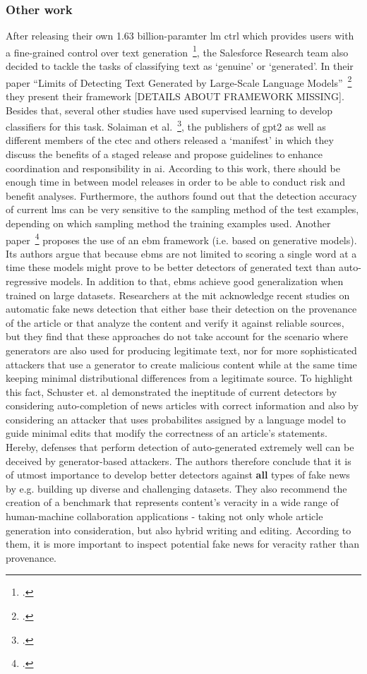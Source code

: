 \subsubsection{Other work}
\label{sub:other_work}

After releasing their own 1.63 billion-paramter \gls{lm} \gls{ctrl} which provides users with a fine-grained control over text generation~\footcite{keskar2019ctrl}, the Salesforce Research team also decided to tackle the tasks of classifying text as `genuine' or `generated'. In their paper ``Limits of Detecting Text Generated by Large-Scale Language Models''~\footcite{varshney2020limits} they present their framework [DETAILS ABOUT FRAMEWORK MISSING]. Besides that, several other studies have used supervised learning to develop classifiers for this task.
Solaiman et al.~\footcite{solaiman2019release}, the publishers of \gls{gpt2} as well as different members of the \gls{ctec} and others released a `manifest' in which they discuss the benefits of a staged release and propose guidelines to enhance coordination and responsibility in \gls{ai}. According to this work, there should be enough time in between model releases in order to be able to conduct risk and benefit analyses. Furthermore, the authors found out that the detection accuracy of current \gls{lm}s can be very sensitive to the sampling method of the test examples, depending on which sampling method the training examples used.
Another paper~\footcite{DBLP:journals/corr/abs-1906-03351} proposes the use of an \gls{ebm} framework (i.e. based on generative models). Its authors argue that because \gls{ebm}s are not limited to scoring a single word at a time these models might prove to be better detectors of generated text than auto-regressive models. In addition to that, \gls{ebm}s achieve good generalization when trained on large datasets.
Researchers at the \gls{mit} acknowledge recent studies on automatic fake news detection that either base their detection on the provenance of the article or that analyze the content and verify it against reliable sources, but they find that these approaches do not take account for the scenario where generators are also used for producing legitimate text, nor for more sophisticated attackers that use a generator to create malicious content while at the same time keeping minimal distributional differences from a legitimate source. To highlight this fact, Schuster et. al demonstrated the ineptitude of current detectors by considering auto-completion of news articles with correct information and also by considering an attacker that uses probabilites assigned by a language model to guide minimal edits that modify the correctness of an article's statements. Hereby, defenses that perform detection of auto-generated extremely well can be deceived by generator-based attackers. The authors therefore conclude that it is of utmost importance to develop better detectors against \textbf{all} types of fake news by e.g. building up diverse and challenging datasets. They also recommend the creation of a benchmark that represents content's veracity in a wide range of human-machine collaboration applications - taking not only whole article generation into consideration, but also hybrid writing and editing. According to them, it is more important to inspect potential fake news for veracity rather than provenance.
